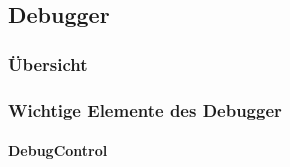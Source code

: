 \documentclass[parskip=full]{scrartcl}
\begin{document}
\subsection{Debugger}
\subsubsection{Übersicht}
\subsubsection{Wichtige Elemente des Debugger}
\paragraph{DebugControl}
\end{document}
